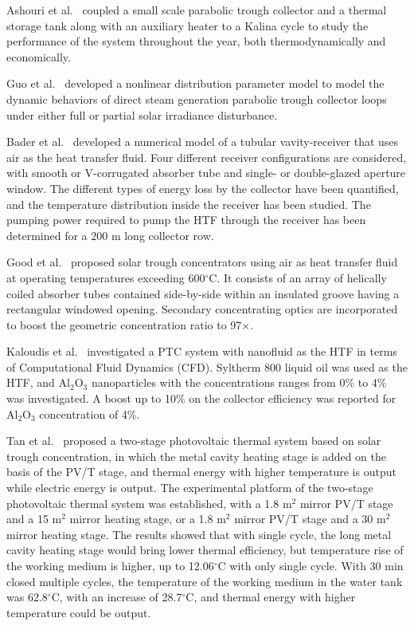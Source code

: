Ashouri et al.~\cite{Ashouri2015} coupled a small scale parabolic trough collector and a thermal storage tank along with an auxiliary heater to a Kalina cycle to study the performance of the system throughout the year, both thermodynamically and economically.

Guo et al.~\cite{SuGuo2016} developed a nonlinear distribution parameter model to model the dynamic behaviors of direct steam generation parabolic trough collector loops under either full or partial solar irradiance disturbance.

Bader et al.~\cite{Bader2015} developed a numerical model of a tubular vavity-receiver that uses air as the heat transfer fluid. Four different receiver configurations are considered, with smooth or V-corrugated absorber tube and single- or double-glazed aperture window. The different types of energy loss by the collector have been quantified, and the temperature distribution inside the receiver has been studied. The pumping power required to pump the HTF through the receiver has been determined for a 200 m long collector row.

Good et al.~\cite{Good2015} proposed solar trough concentrators using air as heat transfer fluid at operating temperatures exceeding 600$\mathrm{^\circ C}$. It consists of an array of helically coiled absorber tubes contained side-by-side within an insulated groove having a rectangular windowed opening. Secondary concentrating optics are incorporated to boost the geometric concentration ratio to 97$\times$.

Kaloudis et al.~\cite{Kaloudis2016} investigated a PTC system with nanofluid as the HTF in terms of Computational Fluid Dynamics (CFD). Syltherm 800 liquid oil was used as the HTF, and Al$_2$O$_3$ nanoparticles with the concentrations ranges from 0\% to 4\% was investigated. A boost up to 10\% on the collector efficiency was reported for Al$_2$O$_3$ concentration of 4\%.

Tan et al.~\cite{Tan2014} proposed a two-stage photovoltaic thermal system based on solar trough concentration, in which the metal cavity heating stage is added on the basis of the PV/T stage, and thermal energy with higher temperature is output while electric energy is output. The experimental platform of the two-stage photovoltaic thermal system was established, with a 1.8 m$^2$ mirror PV/T stage and a 15 m$^2$ mirror heating stage, or a 1.8 m$^2$ mirror PV/T stage and a 30 m$^2$ mirror heating stage. The results showed that with single cycle, the long metal cavity heating stage would bring lower thermal efficiency, but temperature rise of the working medium is higher, up to 12.06$\mathrm{^\circ C}$ with only single cycle. With 30 min closed multiple cycles, the temperature of the working medium in the water tank was 62.8$\mathrm{^\circ C}$, with an increase of 28.7$\mathrm{^\circ C}$, and thermal energy with higher temperature could be output.

